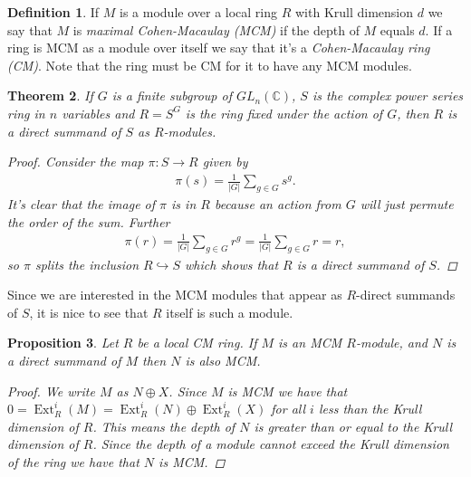 \documentclass[11pt, a4paper, english]{article}
\newtheorem{theorem}{Theorem}[section]
\newtheorem{prop}[theorem]{Proposition}
\theoremstyle{definition}
\newtheorem{defin}[theorem]{Definition}
\newcommand{\C}{\mathbb{C}}
\DeclareMathOperator{\Ext}{Ext}
\begin{document}
\begin{defin}
If $M$ is a module over a local ring $R$ with Krull dimension $d$ we say that $M$ is \textit{maximal Cohen-Macaulay (MCM)} if the depth of $M$ equals $d$. If a ring is MCM as a module over itself we say that it's a \textit{Cohen-Macaulay ring (CM)}. Note that the ring must be CM for it to have any MCM modules.
\end{defin}

\begin{theorem}
If $G$ is a finite subgroup of $GL_n(\C)$, $S$ is the complex power series ring in $n$ variables and $R = S^G$ is the ring fixed under the action of $G$, then $R$ is a direct summand of $S$ as $R$-modules.

\begin{proof}
Consider the map $\pi: S \to R$ given by
\begin{align*}
\pi(s) = \frac{1}{|G|} \sum_{g\in G} s^g.
\end{align*}
It's clear that the image of $\pi$ is in $R$ because an action from $G$ will just permute the order of the sum. Further \begin{align*}
\pi(r) = \frac{1}{|G|} \sum_{g\in G} r^g = \frac{1}{|G|} \sum_{g\in G} r = r,
\end{align*}
so $\pi$ splits the inclusion $R \hookrightarrow S$ which shows that $R$ is a direct summand of $S$.
\end{proof}
\end{theorem}

Since we are interested in the MCM modules that appear as $R$-direct summands of $S$, it is nice to see that $R$ itself is such a module.

\begin{prop}
\label{prop:direct_summand_MCM}
Let $R$ be a local CM ring. If $M$ is an MCM $R$-module, and $N$ is a direct summand of $M$ then $N$ is also MCM.
\begin{proof}
We write $M$ as $N \oplus X$. Since $M$ is MCM we have that $0 = \Ext^i_R(M) = \Ext^i_R(N) \oplus \Ext^i_R(X)$ for all $i$ less than the Krull dimension of $R$. This means the depth of $N$ is greater than or equal to the Krull dimension of $R$. Since the depth of a module cannot exceed the Krull dimension of the ring \cite[\href{https://stacks.math.columbia.edu/tag/0BK4}{Tag 0BK4}]{stacks-project} we have that $N$ is MCM.
\end{proof}
\end{prop}
\end{document}
